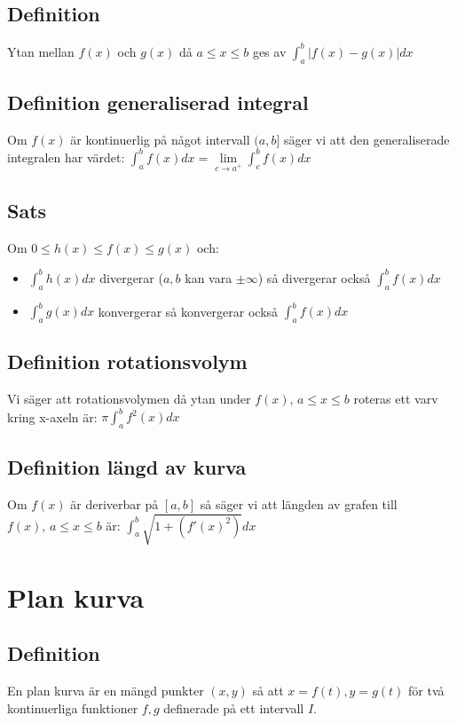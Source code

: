 \documentclass{article}
\begin{document}
\subsection{Definition}
Ytan mellan $f(x)$ och $g(x)$ då $a\leq x\leq b$ ges av ${\displaystyle \int_{a}^{b} |f(x)-g(x)|dx}$

\subsection{Definition generaliserad integral}
Om $f(x)$ är kontinuerlig på något intervall $(a,b]$ säger vi att den generaliserade integralen har värdet: ${\displaystyle\int_{a}^{b}f(x)dx=\lim\limits_{c\to a^{+}}\int_{c}^{b}f(x)dx}$

\subsection{Sats}
Om $0 \leq h(x) \leq f(x) \leq g(x)$ och:
\begin{itemize}
   \item ${\displaystyle\int_{a}^{b}h(x)dx}$ divergerar ($a,b$ kan vara $\pm\infty$) så divergerar också ${\displaystyle\int_{a}^{b}f(x)dx}$
   \item ${\displaystyle\int_{a}^{b}g(x)dx}$ konvergerar så konvergerar också ${\displaystyle\int_{a}^{b}f(x)dx}$
\end{itemize}

\subsection{Definition rotationsvolym}
Vi säger att rotationsvolymen då ytan under $f(x),\, a\leq x\leq b$ roteras ett varv kring x-axeln är: ${\displaystyle \pi\int_{a}^{b}f^2(x)dx  }$

\subsection{Definition längd av kurva}
Om $f(x)$ är deriverbar på $[a,b]$ så säger vi att längden av grafen till\\
$f(x),\, a\leq x\leq b$ är: ${\displaystyle \int_{a}^{b}\sqrt{1+(f'(x)^2)}dx}$

\section{Plan kurva}
\subsection{Definition}
En plan kurva är en mängd punkter $(x,y)$ så att $x=f(t),y=g(t)$ för två kontinuerliga funktioner $f,g$ definerade på ett intervall $I$.
\end{document}
